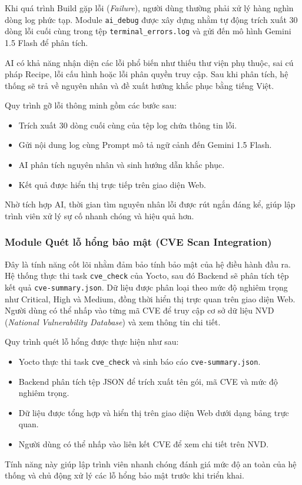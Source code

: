 Khi quá trình Build gặp lỗi (\textit{Failure}), người dùng thường phải xử lý hàng nghìn dòng log phức tạp. Module \texttt{ai\_debug} được xây dựng nhằm tự động trích xuất 30 dòng lỗi cuối cùng trong tệp \texttt{terminal\_errors.log} và gửi đến mô hình Gemini 1.5 Flash để phân tích.

AI có khả năng nhận diện các lỗi phổ biến như thiếu thư viện phụ thuộc, sai cú pháp Recipe, lỗi cấu hình hoặc lỗi phân quyền truy cập. Sau khi phân tích, hệ thống sẽ trả về nguyên nhân và đề xuất hướng khắc phục bằng tiếng Việt.

Quy trình gỡ lỗi thông minh gồm các bước sau:

\begin{itemize}
    \item Trích xuất 30 dòng cuối cùng của tệp log chứa thông tin lỗi.
    \item Gửi nội dung log cùng Prompt mô tả ngữ cảnh đến Gemini 1.5 Flash.
    \item AI phân tích nguyên nhân và sinh hướng dẫn khắc phục.
    \item Kết quả được hiển thị trực tiếp trên giao diện Web.
\end{itemize}

Nhờ tích hợp AI, thời gian tìm nguyên nhân lỗi được rút ngắn đáng kể, giúp lập trình viên xử lý sự cố nhanh chóng và hiệu quả hơn.
\subsubsection{Module Quét lỗ hổng bảo mật (CVE Scan Integration)}

Đây là tính năng cốt lõi nhằm đảm bảo tính bảo mật của hệ điều hành đầu ra. Hệ thống thực thi task \texttt{cve\_check} của Yocto, sau đó Backend sẽ phân tích tệp kết quả \texttt{cve-summary.json}. Dữ liệu được phân loại theo mức độ nghiêm trọng như Critical, High và Medium, đồng thời hiển thị trực quan trên giao diện Web. Người dùng có thể nhấp vào từng mã CVE để truy cập cơ sở dữ liệu NVD (\textit{National Vulnerability Database}) và xem thông tin chi tiết.

Quy trình quét lỗ hổng được thực hiện như sau:

\begin{itemize}
    \item Yocto thực thi task \texttt{cve\_check} và sinh báo cáo \texttt{cve-summary.json}.
    \item Backend phân tích tệp JSON để trích xuất tên gói, mã CVE và mức độ nghiêm trọng.
    \item Dữ liệu được tổng hợp và hiển thị trên giao diện Web dưới dạng bảng trực quan.
    \item Người dùng có thể nhấp vào liên kết CVE để xem chi tiết trên NVD.
\end{itemize}

Tính năng này giúp lập trình viên nhanh chóng đánh giá mức độ an toàn của hệ thống và chủ động xử lý các lỗ hổng bảo mật trước khi triển khai.

